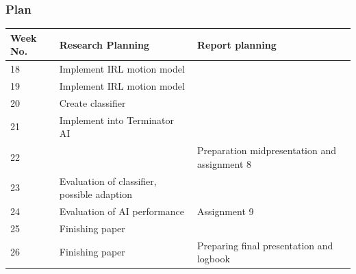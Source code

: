 \documentclass{beamer}
\begin{document}
        \begin{frame}
            \frametitle{Plan}
            \begin{table}
                \centering
                \begin{tabular}{|l|p{5cm}|p{4cm}|}
                    \hline                        
                    Week No. & Research Planning & Report planning \\
                    \hline
                    \hline
                    18 &  Implement IRL motion model& \\
                    \hline
                    19 &  Implement IRL motion model& \\
                    \hline
                    20 &  Create classifier&\\
                    \hline
                    21 &  Implement into Terminator AI& \\
                    \hline
                    22 & & Preparation midpresentation and assignment 8\\
                    \hline
                    23 &  Evaluation of classifier, possible adaption&\\
                    \hline
                    24 &  Evaluation of AI performance & Assignment 9 \\
                    \hline
                    25 &  Finishing paper & \\
                    \hline
                    26 & Finishing paper & Preparing final presentation and logbook \\
                    \hline
                \end{tabular}
            \end{table}
        \end{frame}



        
\end{document}
